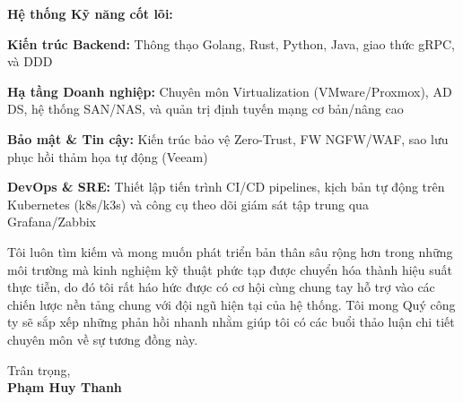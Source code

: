 \documentclass[10pt, letterpaper]{article}
\begin{document}
\begin{onecolentry}
\vspace{0.2cm}

\textbf{Hệ thống Kỹ năng cốt lõi:}

\vspace{0.1cm}

\begin{highlights}
    \item \textbf{Kiến trúc Backend:} Thông thạo Golang, Rust, Python, Java, giao thức gRPC, và DDD
    \item \textbf{Hạ tầng Doanh nghiệp:} Chuyên môn Virtualization (VMware/Proxmox), AD DS, hệ thống SAN/NAS, và quản trị định tuyến mạng cơ bản/nâng cao
    \item \textbf{Bảo mật \& Tin cậy:} Kiến trúc bảo vệ Zero-Trust, FW NGFW/WAF, sao lưu phục hồi thảm họa tự động (Veeam)
    \item \textbf{DevOps \& SRE:} Thiết lập tiến trình CI/CD pipelines, kịch bản tự động trên Kubernetes (k8s/k3s) và công cụ theo dõi giám sát tập trung qua Grafana/Zabbix
\end{highlights}

\vspace{0.2cm}

Tôi luôn tìm kiếm và mong muốn phát triển bản thân sâu rộng hơn trong những môi trường mà kinh nghiệm kỹ thuật phức tạp được chuyển hóa thành hiệu suất thực tiễn, do đó tôi rất háo hức được có cơ hội cùng chung tay hỗ trợ vào các chiến lược nền tảng chung với đội ngũ hiện tại của hệ thống. Tôi mong Quý công ty sẽ sắp xếp những phản hồi nhanh nhằm giúp tôi có các buổi thảo luận chi tiết chuyên môn về sự tương đồng này.

\vspace{0.4cm}

Trân trọng,\\
\textbf{Phạm Huy Thanh}

\end{onecolentry}
\end{document}

